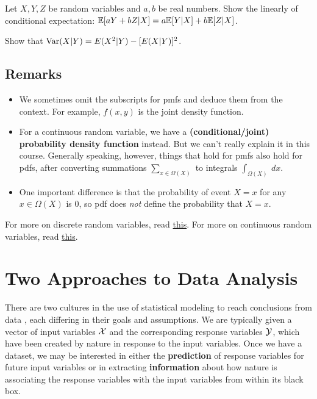 \documentclass{discussion}
\begin{document}
\vspace{1em}


\begin{exercise}
Let $X,Y,Z$ be random variables and $a,b$ be real numbers. Show the linearly of conditional expectation: $\mathbb{E}[aY + bZ | X] = a\mathbb{E}[Y | X] + b\mathbb{E}[Z | X]$.
\end{exercise}

\vspace{1em}

\begin{exercise}
Show that $\mathrm{Var}(X | Y) = E(X^2 | Y) - [E(X | Y)]^2$.
\end{exercise}

\subsection*{Remarks}
\begin{itemize}
\item We sometimes omit the subscripts for pmfs and deduce them from the context. For example, $f(x,y)$ is the joint density function.
\item For a continuous random variable, we have a \textbf{(conditional/joint) probability density function} instead. But we can't really explain it in this course. Generally speaking, however, things that hold for pmfs also hold for pdfs, after converting summations $\sum_{x \in \Omega(X)}$  to integrals $\int_{\Omega(X)} \ dx$.
\item One important difference is that the probability of event $X = x$ for any $x \in \Omega(X)$ is 0, so pdf does \textit{not} define the probability that $X = x$.
\end{itemize}


For more on discrete random variables, read \href{http://ocw.mit.edu/courses/mathematics/18-05-introduction-to-probability-and-statistics-spring-2014/readings/MIT18_05S14_Reading3.pdf}{this}. For more on continuous random variables, read \href{http://www.math.uah.edu/stat/expect/Conditional.html}{this}.

\section{Two Approaches to Data Analysis}

There are two cultures in the use of statistical modeling to reach conclusions from data \citep{breiman2001}, each differing in their goals and assumptions.  We are typically given a vector of input variables $\mathcal{X}$ and the corresponding response variables $\mathcal{Y}$, which have been created by nature in response to the input variables. Once we have a dataset, we may be interested in either the \textbf{prediction} of response variables for future input variables or in extracting \textbf{information} about how nature is associating the response variables with the input variables from within its black box.
\end{document}
